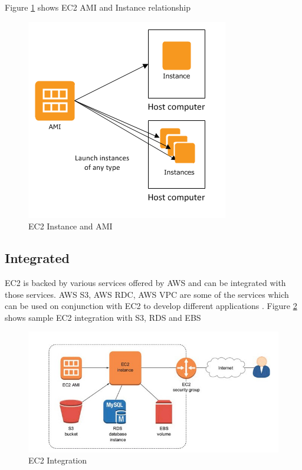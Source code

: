 Figure \ref{f:ec2-ami-instance} shows EC2 AMI and Instance relationship
\begin{figure}[!ht]
  \centering\includegraphics[width=\columnwidth]{images/ec2AMI.PNG}
  \caption{EC2 Instance and AMI \cite{www-aws-ec2instance}}\label{f:ec2-ami-instance}
\end{figure}

\subsection{Integrated}
EC2 is backed by various services offered by AWS and can be integrated with those services. AWS S3, AWS RDC, AWS VPC are some of the services which can be used on conjunction with EC2 to develop different applications \cite{www-aws-ec2}.
Figure \ref{f:ec2-integration} shows sample EC2 integration with S3, RDS and EBS 
\begin{figure}[!ht]
  \centering\includegraphics[width=\columnwidth]{images/ec2Integration.PNG}
  \caption{EC2 Integration \cite{www-medium-aws}}\label{f:ec2-integration}
\end{figure}

